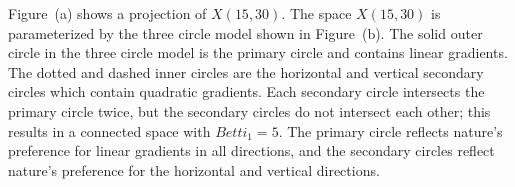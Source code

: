\documentclass[amscd, amssymb, verbatim]{amsart}[12pt]
\theoremstyle{remark}
\theoremstyle{remark}
\theoremstyle{remark}
\begin{document}
\begin{figure}[htp]
  \begin{center}
    \quad
   \end{center}
\end{figure}
\FloatBarrier

Figure~(a) shows a projection of $X(15,30)$. The space $X(15,30)$ is parameterized by the three circle model shown in Figure~(b). The solid outer circle in the three circle model is the primary circle and contains linear gradients. The dotted and dashed inner circles are the horizontal and vertical secondary circles which contain quadratic gradients. Each secondary circle intersects the primary circle twice, but the secondary circles do not intersect each other; this results in a connected space with $Betti_1 = 5$. The primary circle reflects nature's preference for linear gradients in all directions, and the secondary circles reflect nature's preference for the horizontal and vertical directions.
\end{document}
